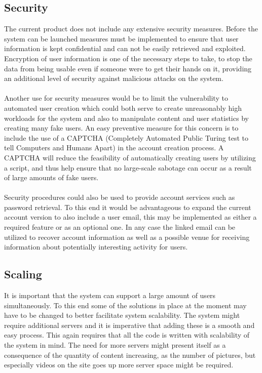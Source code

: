 \subsection{Security}
\label{subsec:FurtherRequiredSecurity}

The current product does not include any extensive security measures. Before the system can be launched measures must be implemented to ensure that user information is kept confidential and can not be easily retrieved and exploited. Encryption of user information is one of the necessary steps to take, to stop the data from being usable even if someone were to get their hands on it, providing an additional level of security against malicious attacks on the system.
\paragraph{} Another use for security measures would be to limit the vulnerability to automated user creation which could both serve to create unreasonably high workloads for the system and also to manipulate content and user statistics by creating many fake users. An easy preventive measure for this concern is to include the use of a CAPTCHA (Completely Automated Public Turing test to tell Computers and Humans Apart) in the account creation process. A CAPTCHA will reduce the feasibility of automatically creating users by utilizing a script, and thus help ensure that no large-scale sabotage can occur as a result of large amounts of fake users.
\paragraph{} Security procedures could also be used to provide account services such as password retrieval. To this end it would be advantageous to expand the current account version to also include a user email, this may be implemented as either a required feature or as an optional one. In any case the linked email can be utilized to recover account information as well as a possible venue for receiving information about potentially interesting activity for users.

\subsection{Scaling}
\label{subsec:FurtherRequiredScaling}

It is important that the system can support a large amount of users simultaneously. To this end some of the solutions in place at the moment may have to be changed to better facilitate system scalability. The system might require additional servers and it is imperative that adding these is a smooth and easy process. This again requires that all the code is written with scalability of the system in mind. The need for more servers might present itself as a consequence of the quantity of content increasing, as the number of pictures, but especially videos on the site goes up more server space might be required.
